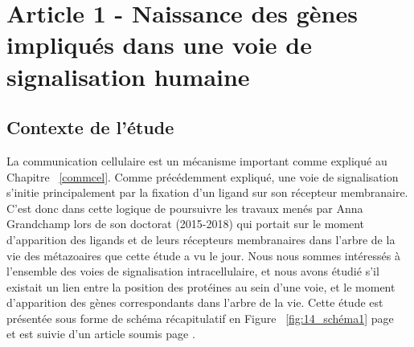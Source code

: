 \chapter[Naissance des gènes impliqués dans une voie de signalisation humaine]{Article 1 - Naissance des gènes impliqués dans une voie de signalisation humaine}
\thispagestyle{firstpage}%
\onehalfspacing

\section{Contexte de l'étude}
\par La communication cellulaire est un mécanisme important comme expliqué au Chapitre ~\ref{commcel}. Comme précédemment expliqué, une voie de signalisation s’initie principalement par la fixation d’un ligand sur son récepteur membranaire. C’est donc dans cette logique de poursuivre les travaux menés par Anna Grandchamp lors de son doctorat (2015-2018) qui portait sur le moment d’apparition des ligands et de leurs récepteurs membranaires dans l’arbre de la vie des métazoaires que cette étude a vu le jour. Nous nous sommes intéressés à l’ensemble des voies de signalisation intracellulaire, et nous avons étudié s’il existait un lien entre la position des protéines au sein d’une voie, et le moment d’apparition des gènes correspondants dans l’arbre de la vie. Cette étude est présentée sous forme de schéma récapitulatif en Figure ~\ref{fig:14_schéma1} page ~\pageref{fig:14_schéma1} et est suivie d’un article soumis page \pageref{art1}.

